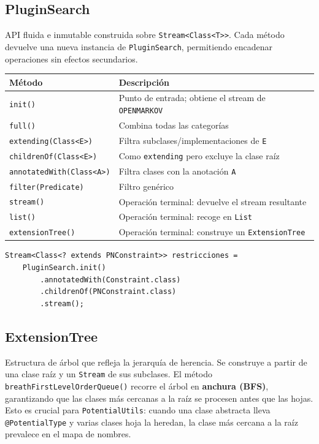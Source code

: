 \documentclass[12pt,a4paper,spanish]{article}
\begin{document}
\subsection{PluginSearch}

API fluida e inmutable construida sobre \texttt{Stream<Class<T>>}. Cada método
devuelve una nueva instancia de \texttt{PluginSearch}, permitiendo encadenar
operaciones sin efectos secundarios.

\begin{center}
\begin{tabular}{ll}
\toprule
\textbf{Método} & \textbf{Descripción} \\
\midrule
\texttt{init()} & Punto de entrada; obtiene el stream de \texttt{OPENMARKOV} \\
\texttt{full()} & Combina todas las categorías \\
\texttt{extending(Class<E>)} & Filtra subclases/implementaciones de \texttt{E} \\
\texttt{childrenOf(Class<E>)} & Como \texttt{extending} pero excluye la clase raíz \\
\texttt{annotatedWith(Class<A>)} & Filtra clases con la anotación \texttt{A} \\
\texttt{filter(Predicate)} & Filtro genérico \\
\texttt{stream()} & Operación terminal: devuelve el stream resultante \\
\texttt{list()} & Operación terminal: recoge en \texttt{List} \\
\texttt{extensionTree()} & Operación terminal: construye un \texttt{ExtensionTree} \\
\bottomrule
\end{tabular}
\end{center}

\begin{lstlisting}[language=JavaPlugin,
    caption={Ejemplo de PluginSearch encadenado para buscar restricciones}]
Stream<Class<? extends PNConstraint>> restricciones =
    PluginSearch.init()
        .annotatedWith(Constraint.class)
        .childrenOf(PNConstraint.class)
        .stream();
\end{lstlisting}

\subsection{ExtensionTree}

Estructura de árbol que refleja la jerarquía de herencia. Se construye a partir
de una clase raíz y un \texttt{Stream} de sus subclases. El método
\texttt{breathFirstLevelOrderQueue()} recorre el árbol en \textbf{anchura (BFS)},
garantizando que las clases más cercanas a la raíz se procesen antes que las
hojas. Esto es crucial para \texttt{PotentialUtils}: cuando una clase abstracta
lleva \texttt{@PotentialType} y varias clases hoja la heredan, la clase más
cercana a la raíz prevalece en el mapa de nombres.
\end{document}
